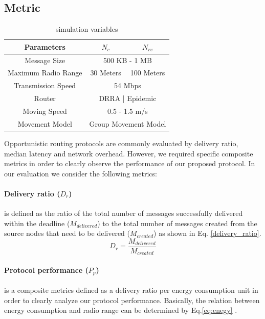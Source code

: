 \documentclass[conference]{IEEEtran}
\begin{document}
\subsection{Metric}
\begin{table}[!t]
	\renewcommand{\arraystretch}{1.3}
	\caption{simulation variables}
	\label{table_parameters}
	\centering
	\begin{tabular}{|c|c|c|}
		\hline
		Parameters         &  $N_{c}$ & $N_{rv}$ \\ \hline
		Message Size       &  \multicolumn{2}{|c|}{500 KB - 1 MB}        \\ \hline
		Maximum Radio Range & 30 Meters  & 100 Meters \\ \hline
		Transmission Speed &  \multicolumn{2}{|c|}{ 54 Mbps   }        \\ \hline
		Router             & \multicolumn{2}{|c|}{ DRRA | Epidemic   } \\ \hline
		Moving Speed       &   \multicolumn{2}{|c|}{0.5 - 1.5 m/s }        \\ \hline
		Movement Model     &   \multicolumn{2}{|c|}{Group Movement Model  }      \\ \hline
	\end{tabular}
\end{table}
Opportunistic routing protocols are commonly evaluated by delivery ratio, median latency and network overhead.
However, we required specific composite metrics in order to clearly observe the performance of our proposed protocol. 
In our evaluation we consider the following metrics:

	\paragraph{Delivery ratio ($D_{r}$)} is defined as the ratio of the total number of messages successfully delivered within the deadline ($ { M }_{ delivered }$) to the total number of messages created from the source nodes that need to be delivered ($ { M }_{ created }$) as shown in Eq. \ref{delivery_ratio}.
	\begin{equation}
	\label{delivery_ratio}
	D_{r} =\frac { { M }_{ delivered } }{ { M }_{ created } } 
	\end{equation}

\paragraph{Protocol performance ($P_{p}$)} is a composite metrics defined as a delivery ratio per energy consumption unit in order to clearly analyze our protocol performance.
Basically, the relation between energy consumption and radio range can be determined by Eq.\ref{eq:enegy} \cite{Yang2010, Wang2006}.
\end{document}
